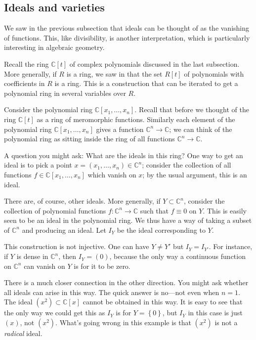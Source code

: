 \subsection{Ideals and varieties}

We saw in the previous subsection that ideals can be thought of as the
vanishing of functions. This, like divisibility, is another interpretation,
which is particularly interesting in algebraic geometry.


Recall the  ring $\mathbb{C}[t]$ of complex polynomials discussed in the
last subsection. More generally, if $R$ is a ring,  we saw in
 that the set $R[t]$ of polynomials with coefficients
in $R$
is a ring.  This is a construction that
can be iterated to get a polynomial ring in several variables over $R$.

\begin{example} 
Consider the polynomial ring $\mathbb{C}[x_1, \dots, x_n]$. Recall that before
we thought of the ring $\mathbb{C}[t]$ as a ring of meromorphic functions.  
Similarly each element of the polynomial ring $\mathbb{C}[x_1, \dots, x_n]$
gives a function $\mathbb{C}^n \to \mathbb{C}$; we can think of the polynomial
ring as sitting inside the ring of all functions $\mathbb{C}^n \to \mathbb{C}$.

A question you might ask: What are the ideals in this ring?  One way to get an
ideal is to pick a point $x=(x_1, \dots, x_n) \in \mathbb{C}^n$; consider the
collection of all functions $f \in \mathbb{C}[x_1, \dots, x_n]$ which vanish on
$x$; by the usual argument, this is an ideal.

There are, of course, other ideals. More generally, if $Y \subset
\mathbb{C}^n$, consider the collection of polynomial functions $f:
\mathbb{C}^n \to \mathbb{C}$ such that $f \equiv 0$ on
$Y$.  This is easily seen to be an ideal in the polynomial ring. We thus have a
way of taking a subset of $\mathbb{C}^n$ and producing an ideal.
Let $I_Y$ be the ideal corresponding to $Y$.  

This construction is not injective. One can have $Y \neq Y'$ but $I_Y = I_{Y'}$. For instance, if $Y$ is dense in
$\mathbb{C}^n$, then $I_Y = (0)$, because the only way a continuous function on
$\mathbb{C}^n$ can vanish on $Y$ is for it to be zero.

There is a much closer connection in the other direction. You might ask whether
all ideals can arise in this way. The quick answer is no---not even when $n=1$. The ideal $(x^2) \subset \mathbb{C}[x]$ cannot be obtained
in this way.  It is easy to see that the only way we could get this as $I_Y$ is
for $Y=\left\{0\right\}$, but $I_Y$ in this case is just $(x)$, not $(x^2)$.
What's going wrong in this example is that $(x^2)$ is not a \emph{radical}
ideal.
\end{example} 

